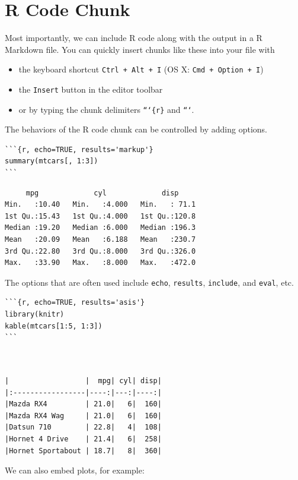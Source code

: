 \documentclass[11pt]{article}
\begin{document}
\section{R Code Chunk}
\label{sec:org33fc192}

Most importantly, we can include R code along with the output in a R
Markdown file. You can quickly insert chunks like these into your file
with

\begin{itemize}
\item the keyboard shortcut \texttt{Ctrl + Alt + I} (OS X: \texttt{Cmd + Option + I})
\item the \texttt{Insert} button in the editor toolbar
\item or by typing the chunk delimiters \texttt{```\{r\}} and \texttt{```}.
\end{itemize}

The behaviors of the R code chunk can be controlled by adding options.

\begin{verbatim}
```{r, echo=TRUE, results='markup'}
summary(mtcars[, 1:3])
```
\end{verbatim}

\begin{verbatim}
     mpg             cyl             disp
Min.   :10.40   Min.   :4.000   Min.   : 71.1
1st Qu.:15.43   1st Qu.:4.000   1st Qu.:120.8
Median :19.20   Median :6.000   Median :196.3
Mean   :20.09   Mean   :6.188   Mean   :230.7
3rd Qu.:22.80   3rd Qu.:8.000   3rd Qu.:326.0
Max.   :33.90   Max.   :8.000   Max.   :472.0
\end{verbatim}

The options that are often used include \texttt{echo}, \texttt{results}, \texttt{include},
and \texttt{eval}, etc.

\begin{verbatim}
```{r, echo=TRUE, results='asis'}
library(knitr)
kable(mtcars[1:5, 1:3])
```
\end{verbatim}

\begin{verbatim}


|                  |  mpg| cyl| disp|
|:-----------------|----:|---:|----:|
|Mazda RX4         | 21.0|   6|  160|
|Mazda RX4 Wag     | 21.0|   6|  160|
|Datsun 710        | 22.8|   4|  108|
|Hornet 4 Drive    | 21.4|   6|  258|
|Hornet Sportabout | 18.7|   8|  360|
\end{verbatim}

We can also embed plots, for example:
\end{document}
